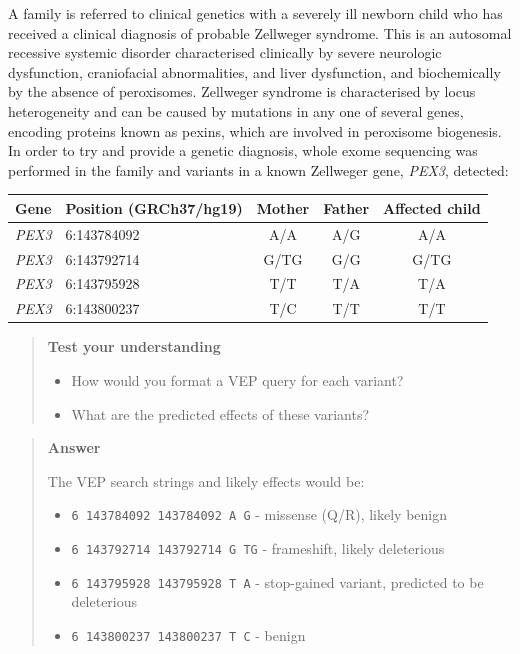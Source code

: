 \documentclass[
  letterpaper,
  DIV=11,
  numbers=noendperiod]{scrreprt}
\newcounter{none} %
\providecommand{\tightlist}{%
  \setlength{\itemsep}{0pt}\setlength{\parskip}{0pt}}
\begin{document}
\begin{tcolorbox}
A family is referred to clinical genetics with a severely ill newborn
child who has received a clinical diagnosis of probable Zellweger
syndrome. This is an autosomal recessive systemic disorder characterised
clinically by severe neurologic dysfunction, craniofacial abnormalities,
and liver dysfunction, and biochemically by the absence of peroxisomes.
Zellweger syndrome is characterised by locus heterogeneity and can be
caused by mutations in any one of several genes, encoding proteins known
as pexins, which are involved in peroxisome biogenesis. In order to try
and provide a genetic diagnosis, whole exome sequencing was performed in
the family and variants in a known Zellweger gene, \emph{PEX3},
detected:

{\def\LTcaptype{none} %
\begin{longtable}[]{@{}llccc@{}}
\toprule\noalign{}
Gene & Position (GRCh37/hg19) & Mother & Father & Affected child \\
\midrule\noalign{}
\endhead
\bottomrule\noalign{}
\endlastfoot
\emph{PEX3} & 6:143784092 & A/A & A/G & A/A \\
\emph{PEX3} & 6:143792714 & G/TG & G/G & G/TG \\
\emph{PEX3} & 6:143795928 & T/T & T/A & T/A \\
\emph{PEX3} & 6:143800237 & T/C & T/T & T/T \\
\end{longtable}
}

\begin{quote}
\textbf{Test your understanding}

\begin{itemize}
\tightlist
\item
  How would you format a VEP query for each variant?
\item
  What are the predicted effects of these variants?
\end{itemize}
\end{quote}

\begin{quote}
\textbf{Answer}

The VEP search strings and likely effects would be:

\begin{itemize}
\tightlist
\item
  \texttt{6\ 143784092\ 143784092\ A\ G} - missense (Q/R), likely benign
\item
  \texttt{6\ 143792714\ 143792714\ G\ TG} - frameshift, likely
  deleterious
\item
  \texttt{6\ 143795928\ 143795928\ T\ A} - stop-gained variant,
  predicted to be deleterious
\item
  \texttt{6\ 143800237\ 143800237\ T\ C} - benign
\end{itemize}
\end{quote}


\end{tcolorbox}
\end{document}
